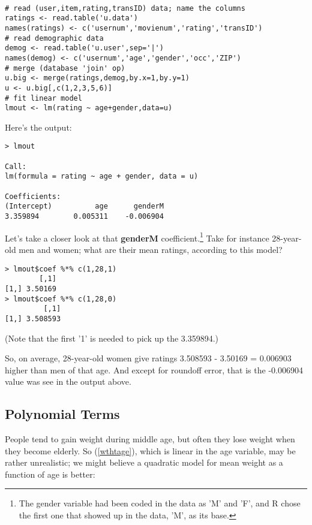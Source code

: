 \begin{lstlisting}

# read (user,item,rating,transID) data; name the columns
ratings <- read.table('u.data') 
names(ratings) <- c('usernum','movienum','rating','transID') 
# read demographic data
demog <- read.table('u.user',sep='|') 
names(demog) <- c('usernum','age','gender','occ','ZIP') 
# merge (database 'join' op)
u.big <- merge(ratings,demog,by.x=1,by.y=1) 
u <- u.big[,c(1,2,3,5,6)] 
# fit linear model
lmout <- lm(rating ~ age+gender,data=u) 

\end{lstlisting}

Here's the output:

\begin{lstlisting}
> lmout

Call:
lm(formula = rating ~ age + gender, data = u)

Coefficients:
(Intercept)          age      genderM  
3.359894        0.005311    -0.006904  
\end{lstlisting}

Let's take a closer look at that \textbf{genderM}
coefficient.\footnote{The gender variable had been coded in the data as
'M' and 'F', and R chose the first one that showed up in the data, 'M',
as its base.}  Take for instance 28-year-old men and women; what are
their mean ratings, according to this model?

\begin{lstlisting}
> lmout$coef %*% c(1,28,1)
        [,1]
[1,] 3.50169
> lmout$coef %*% c(1,28,0)
         [,1]
[1,] 3.508593
\end{lstlisting}

(Note that the first '1' is needed to pick up the 3.359894.)

So, on average, 28-year-old women give ratings 3.508593 - 3.50169 =
0.006903 higher than men of that age.  And except for roundoff error,
that is the -0.006904 value was see in the output above.  

\subsection{Polynomial Terms}
\label{poly}

People tend to gain weight during middle age, but often they lose weight
when they become elderly.  So (\ref{wthtage}), which is linear in the
age variable, may be rather unrealistic; we might believe a quadratic
model for mean weight as a function of age is better:

